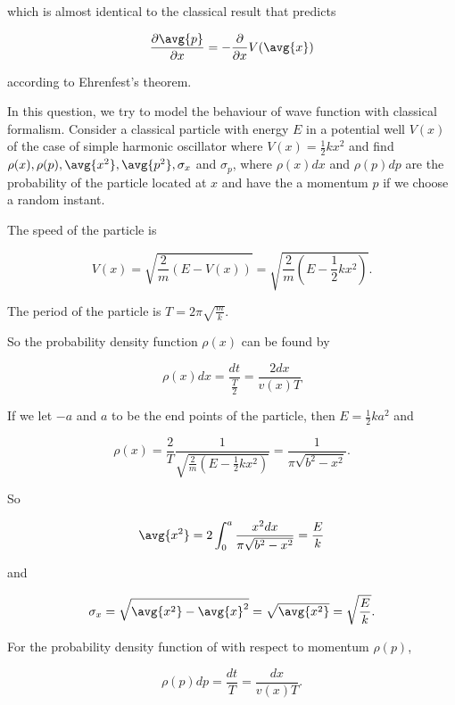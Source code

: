 \documentclass[a4paper,12pt]{report}
\begin{document}
{which is almost identical to the classical result that predicts 

\begin{equation}
  \frac{\partial \avg{p} }{\partial x} = -\frac{\partial }{\partial x} V(\avg{x} ) 
\end{equation}

according to Ehrenfest's theorem.}
	
{In this question, we try to model the behaviour of wave function with classical formalism. Consider a classical particle with energy \(E\) in a potential well \(V(x)\) of the case of simple harmonic oscillator where \(V(x) = \frac12 kx^2\) and find \(\rho(x),\rho(p), \avg{x^2}, \avg{p^2}, \sigma_x\) and \(\sigma_p\), where \(\rho(x)dx\) and \(\rho(p)dp\) are the probability of the particle located at \(x\) and have the a momentum \(p\) if we choose a random instant.}
{The speed of the particle is
	
\begin{equation}
  V(x) = \sqrt{\frac{2}{m} (E - V(x))} = \sqrt{\frac{2}{m} (E - \frac{1}{2} kx^2 )}.  
\end{equation}
		
The period of the particle is  \(\displaystyle T = 2\pi \sqrt{\frac{m}{k}}\).
		
So the probability density function \(\rho(x)\) can be found by
		
\begin{equation}
  \rho (x) dx = \frac{dt}{\frac{T}{2} } = \frac{2dx}{v(x)T}  
\end{equation}
		
If we let \(-a\) and \(a\) to be the end points of the particle, then \(\displaystyle E = \frac{1}{2}  ka^2\) and
		
\begin{equation}
  \rho (x) = \frac{2}{T} \frac{1}{\sqrt{\frac{2}{m} \left(E - \frac{1}{2} kx^2 \right)} } = \frac{1}{\pi \sqrt{b^2 -x^2 } }.  
\end{equation}

So 
		
\begin{equation}
  \avg{x^2 } = 2\int_{0}^{a} \frac{x^2 dx}{\pi \sqrt{b^2 -x^2 } } =  \frac{E}{k}    
\end{equation}

and 

\begin{equation}
  \sigma _{x} = \sqrt{\avg{x^2 } - \avg{x} ^2  } = \sqrt{\avg{x^2 } } = \sqrt{\frac{E}{k} }.   
\end{equation}

For the probability density function of with respect to momentum \(\rho(p)\), 

\begin{equation}
  \rho (p)dp = \frac{dt}{T}  = \frac{dx}{v(x)T}.
\end{equation}}
\end{document}
